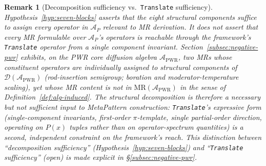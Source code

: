 \documentclass[acmsmall,screen,review]{acmart}
\newtheorem{remark}{Remark}
\begin{document}
\begin{remark}[Decomposition sufficiency vs.\ \texttt{Translate} sufficiency]
\label{rem:block-vs-translate}
Hypothesis~\ref{hyp:seven-blocks} asserts that the eight structural components suffice to \emph{assign} every operator in $\mathcal{A}_P$ relevant to MR derivation. It does not assert that every MR formulable over $\mathcal{A}_P$'s operators is reachable through the framework's \texttt{Translate} operator from a single component invariant. Section~\ref{subsec:negative-pwr} exhibits, on the PWR core diffusion algebra $\mathcal{A}_{\mathrm{PWR}}$, two MRs whose constituent operators are individually assigned to structural components of $\mathcal{D}(\mathcal{A}_{\mathrm{PWR}})$ (rod-insertion semigroup; boration and moderator-temperature scaling), yet whose MR content is not in $\mathrm{MR}(\mathcal{A}_{\mathrm{PWR}})$ in the sense of Definition~\ref{def:alg-induced}. The structural decomposition is therefore a necessary but not sufficient input to MetaPattern construction: \texttt{Translate}'s expressive form (single-component invariants, first-order $\pi$-template, single partial-order direction, operating on $P(x)$ tuples rather than on operator-spectrum quantities) is a second, independent constraint on the framework's reach. This distinction between ``decomposition sufficiency'' (Hypothesis~\ref{hyp:seven-blocks}) and ``\texttt{Translate} sufficiency'' (open) is made explicit in \S\ref{subsec:negative-pwr}.
\end{remark}
\end{document}
